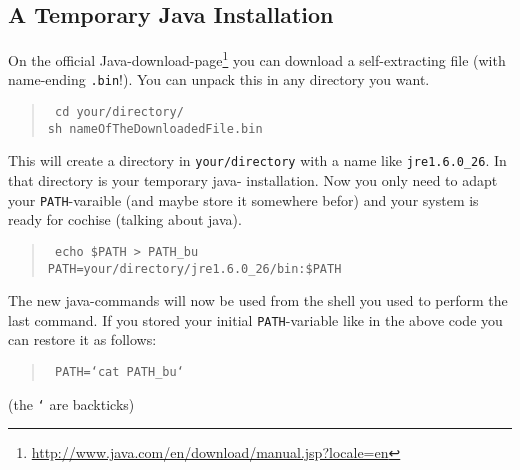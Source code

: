 \documentclass{article}
\newenvironment{code}{\begin{quote}\tt}{\end{quote}}
\begin{document}
\subsection*{A Temporary Java Installation}
On the official Java-download-page\footnote{\url{http://www.java.com/en/download/manual.jsp?locale=en}} you can download a self-extracting
file (with name-ending \texttt{.bin}!). You can unpack this in any directory you want.
\begin{code}
	cd your/directory/\\
	sh nameOfTheDownloadedFile.bin
\end{code}
This will create a directory in \texttt{your/directory} with a name like \texttt{jre1.6.0\_26}. In that directory is your temporary java-
installation. Now you only need to adapt your \texttt{PATH}-varaible (and maybe store it somewhere befor) and your system is ready for cochise
(talking about java).
\begin{code}
	echo \$PATH > PATH\_bu\\
	PATH=your/directory/jre1.6.0\_26/bin:\$PATH
\end{code}
The new java-commands will now be used from the shell you used to perform the last command. If you stored your initial \texttt{PATH}-variable
like in the above code you can restore it as follows:
\begin{code}
	PATH=`cat PATH\_bu`
\end{code}
(the \texttt{`} are backticks)
\end{document}

